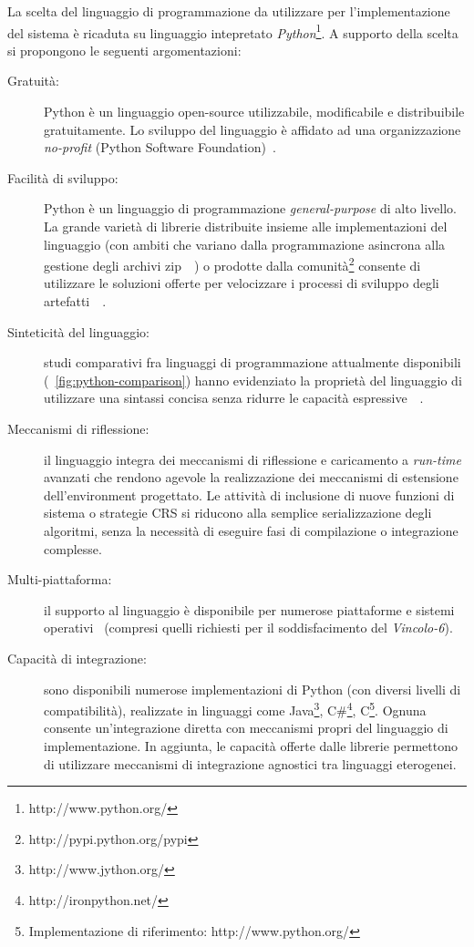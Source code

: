 La scelta del linguaggio di programmazione da utilizzare per l'implementazione del sistema è ricaduta su linguaggio intepretato \emph{Python}\footnote{http://www.python.org/}. A supporto della scelta si propongono le seguenti argomentazioni:
\begin{description}
	\item[Gratuità:] Python è un linguaggio open-source utilizzabile, modificabile e distribuibile gratuitamente. Lo sviluppo del linguaggio è affidato ad una organizzazione \emph{no-profit} (Python Software Foundation)~\cite{pythonfaq}.
	
	\item[Facilità di sviluppo:] Python è un linguaggio di programmazione \emph{general-purpose} di alto livello. La grande varietà di librerie distribuite insieme alle implementazioni del linguaggio (con ambiti che variano dalla programmazione asincrona alla gestione degli archivi zip~\cite{pythonfaq}~\cite{pythonstdlib}) o prodotte dalla comunità\footnote{http://pypi.python.org/pypi} consente di utilizzare le soluzioni offerte per velocizzare i processi di sviluppo degli artefatti~\cite{prechelt2000}~\cite{prashant2008}.
	
	\item[Sinteticità del linguaggio:] studi comparativi fra linguaggi di programmazione attualmente disponibili (\figurename~\ref{fig:python-comparison}) hanno evidenziato la proprietà del linguaggio di utilizzare una sintassi concisa senza ridurre le capacità espressive~\cite{prechelt2000}~\cite{prashant2008}.
	
	\item[Meccanismi di riflessione:] il linguaggio integra dei meccanismi di riflessione e caricamento a \emph{run-time} avanzati che rendono agevole la realizzazione dei meccanismi di estensione dell'environment progettato. Le attività di inclusione di nuove funzioni di sistema o strategie CRS si riducono alla semplice serializzazione degli algoritmi, senza la necessità di eseguire fasi di compilazione o integrazione complesse.
	
	\item[Multi-piattaforma:] il supporto al linguaggio è disponibile per numerose piattaforme e sistemi operativi~\cite{pythonfaq} (compresi quelli richiesti per il  soddisfacimento del \emph{Vincolo-6}).
	
	\item[Capacità di integrazione:] sono disponibili numerose implementazioni di Python (con diversi livelli di compatibilità), realizzate in linguaggi come  Java\footnote{http://www.jython.org/}, C\#\footnote{http://ironpython.net/}, C\footnote{Implementazione di riferimento: http://www.python.org/}. Ognuna consente un'integrazione diretta con meccanismi propri del linguaggio di implementazione. In aggiunta, le capacità offerte dalle librerie permettono di utilizzare meccanismi di integrazione agnostici tra linguaggi eterogenei.
\end{description}

